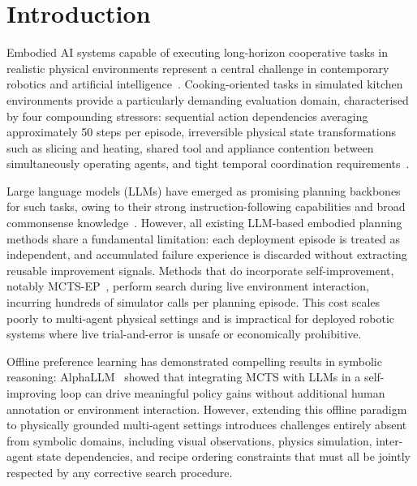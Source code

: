 \documentclass[pdflatex,sn-mathphys-num]{sn-jnl}
\theoremstyle{thmstyleone}
\theoremstyle{thmstyletwo}
\theoremstyle{thmstylethree}
\begin{document}

\maketitle

\section{Introduction}\label{sec:intro}

Embodied AI systems capable of executing long-horizon cooperative tasks
in realistic physical environments represent a central challenge in
contemporary robotics and artificial intelligence~\cite{ahn2022can,
huang2022inner}.
Cooking-oriented tasks in simulated kitchen environments provide a
particularly demanding evaluation domain, characterised by four
compounding stressors: sequential action dependencies averaging
approximately 50 steps per episode, irreversible physical state
transformations such as slicing and heating, shared tool and appliance
contention between simultaneously operating agents, and tight temporal
coordination requirements~\cite{shridhar2020alfred}.

Large language models (LLMs) have emerged as promising planning
backbones for such tasks, owing to their strong instruction-following
capabilities and broad commonsense
knowledge~\cite{song2023llm,nayak2024llamar,liu2025capo}.
However, all existing LLM-based embodied planning methods share a
fundamental limitation: each deployment episode is treated as
independent, and accumulated failure experience is discarded without
extracting reusable improvement signals.
Methods that do incorporate self-improvement, notably
MCTS-EP~\cite{xu2025mcts}, perform search during live environment
interaction, incurring hundreds of simulator calls per planning episode.
This cost scales poorly to multi-agent physical settings and is
impractical for deployed robotic systems where live trial-and-error is
unsafe or economically prohibitive.

Offline preference learning has demonstrated compelling results in
symbolic reasoning: AlphaLLM~\cite{ye2024alphallm} showed that
integrating MCTS with LLMs in a self-improving loop can drive meaningful
policy gains without additional human annotation or environment
interaction.
However, extending this offline paradigm to physically grounded
multi-agent settings introduces challenges entirely absent from symbolic
domains, including visual observations, physics simulation,
inter-agent state dependencies, and recipe ordering constraints that
must all be jointly respected by any corrective search procedure.
\end{document}
